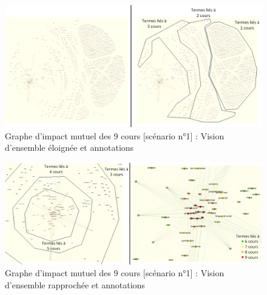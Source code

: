 \begin{figure}[htb!]
\centering
\centerline{  %
\includegraphics[scale=0.75]{4-Experiences/images/cas-1/Graphe-Directe-Explications.png}
}
\caption{Graphe d'impact mutuel des 9 cours [scénario n°1] : Vision d'ensemble éloignée et annotations}
\label{figure:4-cas-1-PII-GrapheDezoom-1}
\end{figure}


\begin{figure}[htb!]
\centering
\centerline{  %
\includegraphics[scale=0.75]{4-Experiences/images/cas-1/Graphe-Directe-ExplicationsCore.png}
}
\caption{Graphe d'impact mutuel des 9 cours [scénario n°1] : Vision d'ensemble rapprochée et annotations}
\label{figure:4-cas-1-PII-GrapheDezoom-2}
\end{figure}



